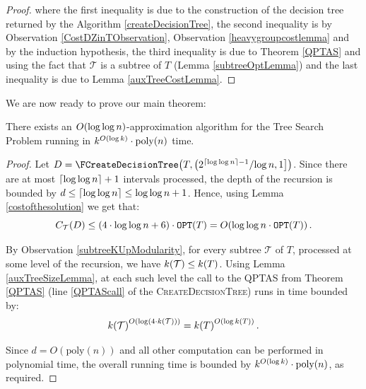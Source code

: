 \begin{lemma}
\begin{proof}
        where the first inequality is due to the construction of the decision tree returned by the Algorithm \ref{createDecisionTree}, the second inequality is by Observation \ref{CostDZinTObservation}, Observation \ref{heavygroupcostlemma} and by the induction hypothesis, the third inequality is due to Theorem \ref{QPTAS} and using the fact that $\mathcal{T}$ is a subtree of $T$ (Lemma \ref{subtreeOptLemma}) and the last inequality is due to Lemma \ref{auxTreeCostLemma}.
        
    \end{proof}
\end{lemma}

We are now ready to prove our main theorem: 
\begin{theorem}
\label{parametrizedAlgorithm}
    There exists an $O\mathopen{}\left( \log\log n \right)$-approximation algorithm for the Tree Search Problem running in $k^{O\mathopen{}\left( \log k \right)}\cdot\text{poly}\mathopen{}\left( n \right)$ time.
    \begin{proof}
        Let $D = \FCreateDecisionTree\br{T, \left({2^{\cl{\log\log n}-1}}/{\log n},1\right]}$. Since there are at most $\mathopen{}\left\lceil \log\log n \right\rceil+1$ intervals processed, the depth of the recursion is bounded by 
        $
        d \leq \mathopen{}\left\lceil \log\log n \right\rceil \leq \log\log n + 1
        $.
        Hence, using Lemma \ref{costofthesolution} we get that:
        $$
        C_{\mathcal{T}}\mathopen{}\left( D \right) \leq (4 \cdot \log\log n + 6) \cdot \texttt{OPT}\mathopen{}\left( T \right) = O\mathopen{}\left( \log\log n \cdot \texttt{OPT}\mathopen{}\left( T \right) \right).
        $$

        By Observation \ref{subtreeKUpModularity}, for every subtree $\mathcal{T}$ of $T$, processed at some level of the recursion, we have $k\mathopen{}\left( \mathcal{T} \right) \leq k\mathopen{}\left( T \right)$. Using Lemma \ref{auxTreeSizeLemma}, at each such level the call to the QPTAS from Theorem \ref{QPTAS} (line \ref{QPTAScall} of the \textsc{CreateDecisionTree}) runs in time bounded by: 
        $$
        k\mathopen{}\left( \mathcal{T} \right)^{O\mathopen{}\left( \log (4 \cdot k\mathopen{}\left( \mathcal{T} \right)) \right)} = k\mathopen{}\left( T \right)^{O\mathopen{}\left( \log k\mathopen{}\left( T \right) \right)}.
        $$
        
        Since $d = O(\text{poly}(n))$ and all other computation can be performed in polynomial time, the overall running time is bounded by 
        $
        k^{O\mathopen{}\left( \log k \right)} \cdot \text{poly}\mathopen{}\left( n \right)
        $,
        as required.
    \end{proof}
\end{theorem}


